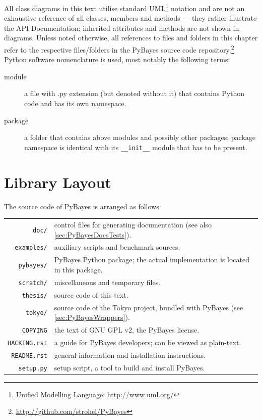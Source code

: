 All class diagrams in this text utilise standard UML\footnote{Unified Modelling Language:
\url{http://www.uml.org/}} notation and are not an exhaustive reference of all classes, members and
methods --- they rather illustrate the API Documentation; inherited attributes and methods are not
shown in diagrams. Unless noted otherwise, all references to
files and folders in this chapter refer to the respective files/folders in the PyBayes source code
repository.\footnote{\url{http://github.com/strohel/PyBayes}} Python software nomenclature is used,
most notably the following terms:
\begin{description}
	\item[module] a file with .py extension (but denoted without it) that contains Python code and
		has its own namespace.
	\item[package] a folder that contains above modules and possibly other packages; package
		namespace is identical with its \verb|__init__| module that has to be present.
\end{description}

\section{Library Layout}

The source code of PyBayes is arranged as follows:

\noindent\begin{tabular}{rp{\textwidth-92pt}}
\verb|doc/|      & control files for generating documentation (see also \autoref{sec:PyBayesDocsTests}). \\
\verb|examples/| & auxiliary scripts and benchmark sources. \\
\verb|pybayes/|  & PyBayes Python package; the actual implementation is located in this package. \\
\verb|scratch/|  & miscellaneous and temporary files. \\
\verb|thesis/|   & source code of this text. \\
\verb|tokyo/|    & source code of the Tokyo project, bundled with PyBayes (see \autoref{sec:PyBayesWrappers}). \\
\verb|COPYING|   & the text of GNU GPL v2, the PyBayes license. \\
\verb|HACKING.rst| & a guide for PyBayes developers; can be viewed as plain-text. \\
\verb|README.rst|  & general information and installation instructions. \\
\verb|setup.py|    & setup script, a tool to build and install PyBayes. \\
\end{tabular}

